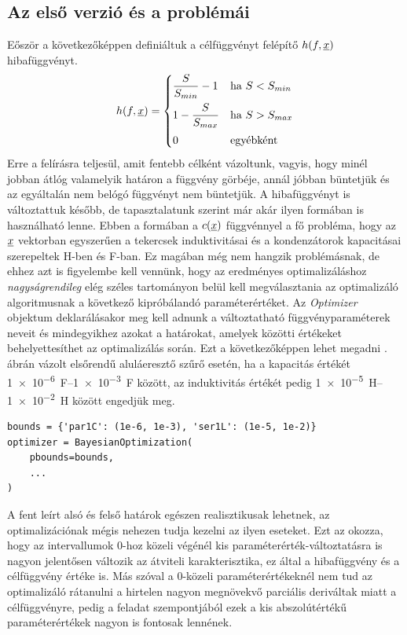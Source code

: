 	\subsection{Az első verzió és a problémái}
        Eőször a következőképpen definiáltuk a célfüggvényt felépítő $h(f,\underline{x})$ hibafüggvényt.
        \begin{equation}
            h(f,\underline{x}) =
            \begin{cases}
                \dfrac{S}{S_{min}}-1 & \mbox{ha } S<S_{min}\\[2ex]
                1-\dfrac{S}{S_{max}} & \mbox{ha } S>S_{max}\\[2ex]
                0 & \text{egyébként}
            \end{cases}
        \end{equation}
        Erre a felírásra teljesül, amit fentebb célként vázoltunk, vagyis, hogy minél jobban átlóg valamelyik határon a függvény görbéje, annál jóbban büntetjük és az egyáltalán nem belógó függvényt nem büntetjük. A hibafüggvényt is változtattuk később, de tapasztalatunk szerint már akár ilyen formában is használható lenne. Ebben a formában a $c(\underline{x})$ függvénnyel a fő probléma, hogy az $\underline{x}$ vektorban egyszerűen a tekercsek induktivitásai és a kondenzátorok kapacitásai szerepeltek H-ben és F-ban. Ez magában még nem hangzik problémásnak, de ehhez azt is figyelembe kell vennünk, hogy az eredményes optimalizáláshoz \emph{nagyságrendileg} elég széles tartományon belül kell megválasztania az optimalizáló algoritmusnak a következő kipróbálandó paraméterértéket.
        Az \emph{Optimizer} objektum deklarálásakor meg kell adnunk a változtatható függvényparaméterek neveit és mindegyikhez azokat a határokat, amelyek közötti értékeket behelyettesíthet az optimalizálás során. Ezt a következőképpen lehet megadni . ábrán vázolt elsőrendű aluláeresztő szűrő esetén, ha a kapacitás értékét \qtyrange{1e-6}{1e-3}{\farad} között, az induktivitás értékét pedig \qtyrange{1e-5}{1e-2}{\henry} között engedjük meg.
        \begin{lstlisting}
bounds = {'par1C': (1e-6, 1e-3), 'ser1L': (1e-5, 1e-2)}
optimizer = BayesianOptimization(
    pbounds=bounds,
    ...
)
\end{lstlisting}

        A fent leírt alsó és felső határok egészen realisztikusak lehetnek, az optimalizációnak mégis nehezen tudja kezelni az ilyen eseteket. Ezt az okozza, hogy az intervallumok 0-hoz közeli végénél kis paraméterérték-változtatásra is nagyon jelentősen változik az átviteli karakterisztika, ez által a hibafüggvény és a célfüggvény értéke is. Más szóval a 0-közeli paraméterértékeknél nem tud az optimalizáló rátanulni a hirtelen nagyon megnövekvő parciális deriváltak miatt a célfüggvényre, pedig a feladat szempontjából ezek a kis abszolútértékű paraméterértékek nagyon is fontosak lennének.

